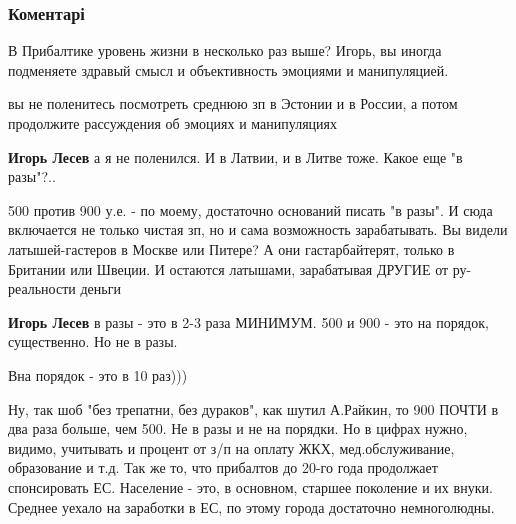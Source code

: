  
 
 
 
 
\subsubsection{Коментарі}
\label{sec:28_06_2018.fb.lesev_igor.1.illjuzii_moskva_pribaltika.cmt}

\begin{itemize} %
В Прибалтике уровень жизни в несколько раз выше? Игорь, вы иногда подменяете здравый смысл и объективность эмоциями и манипуляцией.

\begin{itemize} %
вы не поленитесь посмотреть среднюю зп в Эстонии и в России, а потом продолжите рассуждения об эмоциях и манипуляциях

\textbf{Игорь Лесев} а я не поленился. И в Латвии, и в Литве тоже. Какое еще "в разы"?..


500 против 900 у.е. - по моему, достаточно оснований писать "в разы". И сюда
включается не только чистая зп, но и сама возможность зарабатывать. Вы видели
латышей-гастеров в Москве или Питере? А они гастарбайтерят, только в Британии
или Швеции. И остаются латышами, зарабатывая ДРУГИЕ от ру-реальности деньги


\textbf{Игорь Лесев} в разы - это в 2-3 раза МИНИМУМ.
500 и 900 - это на порядок, существенно.
Но не в разы.

Вна порядок - это в 10 раз)))


Ну, так шоб "без трепатни, без дураков", как шутил А.Райкин, то 900 ПОЧТИ в два
раза больше, чем 500. Не в разы и не на порядки. Но в цифрах нужно, видимо,
учитывать и процент от з/п на оплату ЖКХ, мед.обслуживание, образование и т.д.
Так же то, что прибалтов до 20-го года продолжает спонсировать ЕС. Население -
это, в основном, старшее поколение и их внуки. Среднее уехало на заработки в
ЕС, по этому города достаточно немноголюдны.


\end{itemize}
\end{itemize}
